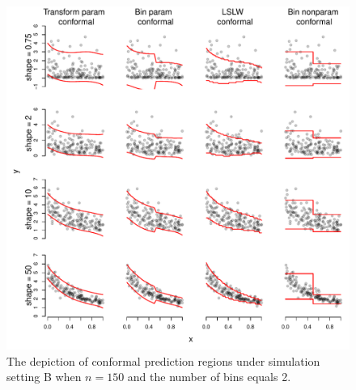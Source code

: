\documentclass[11pt]{article}\usepackage[]{graphicx}\usepackage[]{color}
\makeatletter
\def\maxwidth{ %
  \ifdim\Gin@nat@width>\linewidth
    \linewidth
  \else
    \Gin@nat@width
  \fi
}
\newenvironment{knitrout}{}{} %
\makeatother
\begin{document}
\begin{figure}[h!]
\begin{center}
\begin{knitrout}
\color{fgcolor}
\includegraphics[width=\maxwidth]{figure/conformal-plots-B-150-1} 

\end{knitrout}
\end{center}
\caption{The depiction of conformal prediction regions under simulation 
  setting B when $n = 150$ and the number of bins equals 2.
}
\label{conformal-plots-B-150}
\end{figure}
\end{document}
